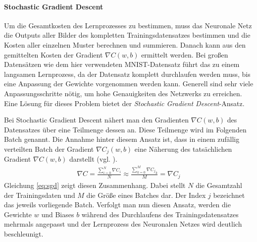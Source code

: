\documentclass[../main.tex]{subfiles}
\begin{document}
\paragraph{Stochastic Gradient Descent}
Um die Gesamtkosten des Lernprozesses zu bestimmen, muss das Neuronale Netz die Outputs aller Bilder des kompletten Trainingsdatensatzes bestimmen und die Kosten aller einzelnen Muster berechnen und summieren. Danach kann aus den gemittelten Kosten der Gradient $\nabla C(w,b)$ ermittelt werden. Bei großen Datensätzen wie dem hier verwendeten MNIST-Datensatz führt das zu einem langsamen Lernprozess, da der Datensatz komplett durchlaufen werden muss, bis eine Anpassung der Gewichte vorgenommen werden kann. Generell sind sehr viele Anpassungsschritte nötig, um hohe Genauigkeiten des Netzwerks zu erreichen. Eine Lösung für dieses Problem bietet der \emph{Stochastic Gradient Descent}-Ansatz. \par 
Bei Stochastic Gradient Descent nähert man den Gradienten $\nabla C(w,b)$ des Datensatzes über eine Teilmenge dessen an. Diese Teilmenge wird im Folgenden Batch genannt. Die Annahme hinter diesem Ansatz ist, dass in einem zufällig verteilten Batch der Gradient $\nabla C_j(w,b)$ eine Näherung des tatsächlichen Gradient $\nabla C(w,b)$ darstellt (vgl. \cite{NNADL_SGD_1}). 
\begin{align}\label{eq:sgd}
	\nabla C = \frac{\sum_{i=0}^{N}\nabla C_i}{N} \approx \frac{\sum_{k=0}^{M}\nabla {C_j}_k}{M} = \nabla C_j
\end{align}
Gleichung \ref{eq:sgd} zeigt diesen Zusammenhang. Dabei stellt $N$ die Gesamtzahl der Trainingsdaten und $M$ die Größe eines Batches dar. Der Index $j$ bezeichnet das jeweils vorliegende Batch. Verfolgt man nun diesen Ansatz, werden die Gewichte $w$ und Biases $b$ während des Durchlaufens des Trainingsdatensatzes mehrmals angepasst und der Lernprozess des Neuronalen Netzes wird deutlich beschleunigt. 
\end{document}
